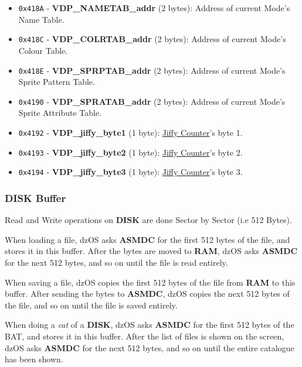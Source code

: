 \documentclass[a4paper,11pt]{article}
\begin{document}
\begin{itemize}
\begin{itemize}
            \item \texttt{0x418A} - \textbf{VDP\_NAMETAB\_addr} (2 bytes):
            Address of current Mode’s Name Table.
            \item \texttt{0x418C} - \textbf{VDP\_COLRTAB\_addr} (2 bytes):
            Address of current Mode’s Colour Table.
            \item \texttt{0x418E} - \textbf{VDP\_SPRPTAB\_addr} (2 bytes):
            Address of current Mode’s Sprite Pattern Table.
            \item \texttt{0x4190} - \textbf{VDP\_SPRATAB\_addr} (2 bytes):
            Address of current Mode’s Sprite Attribute Table.
            \item \texttt{0x4192} - \textbf{VDP\_jiffy\_byte1} (1 byte):
            \hyperref[subsec:jiffy_counter]{Jiffy Counter}'s byte 1.
            \item \texttt{0x4193} - \textbf{VDP\_jiffy\_byte2} (1 byte):
            \hyperref[subsec:jiffy_counter]{Jiffy Counter}'s byte 2.
            \item \texttt{0x4194} - \textbf{VDP\_jiffy\_byte3} (1 byte):
            \hyperref[subsec:jiffy_counter]{Jiffy Counter}'s byte 3.
        \end{itemize}
    \end{itemize}

    \subsubsection{DISK Buffer}

    Read and Write operations on \textbf{DISK} are done Sector by Sector (i.e 
    512 Bytes).

    When loading a file, dzOS asks \textbf{ASMDC} for the first 512 bytes of the
    file, and stores it in this buffer. After the bytes are moved to
    \textbf{RAM}, dzOS asks \textbf{ASMDC} for the next 512 bytes, and so on
    until the file is read entirely.

    When saving a file, dzOS copies the first 512 bytes of the file from
    \textbf{RAM} to this buffer. After sending the bytes to \textbf{ASMDC}, dzOS
    copies the next 512 bytes of the file, and so on until the file is saved
    entirely.

    When doing a \textit{cat} of a \textbf{DISK}, dzOS asks \textbf{ASMDC} for
    the first 512 bytes of the BAT, and stores it in this buffer. After the list
    of files is shown on the screen, dzOS asks \textbf{ASMDC} for the next 512
    bytes, and so on until the entire catalogue has been shown.
\end{document}
